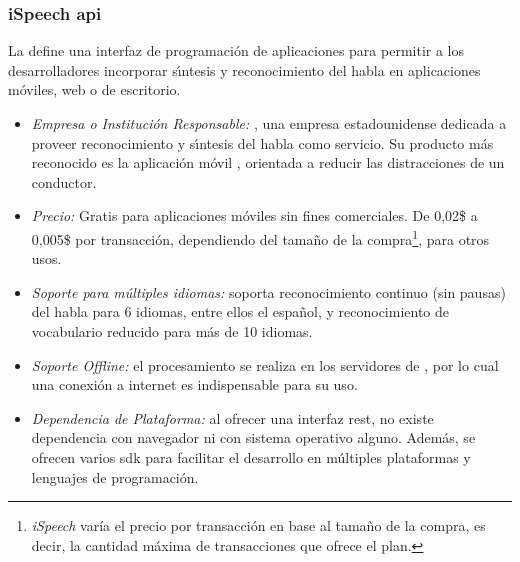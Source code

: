 \subsubsection{iSpeech \gls{api}}
\label{sec:ispeech}

La  \cite{iSpeech} define una interfaz de programaci\'on de aplicaciones para 
permitir a los desarrolladores incorporar s{\'\i}ntesis y reconocimiento del habla en aplicaciones 
m\'oviles, web o de escritorio.

\begin{itemize}
	\item \emph{Empresa o Instituci\'on Responsable:} , una empresa estadounidense dedicada a
	proveer reconocimiento y s{\'\i}ntesis del habla como servicio. Su producto m\'as reconocido es la aplicaci\'on m\'ovil
	, orientada a reducir las distracciones de un conductor.
	\item \emph{Precio:} Gratis para aplicaciones m\'oviles sin fines comerciales. De 0,02\$ a 0,005\$ por
        transacci\'on, dependiendo del tama\~no de la compra\footnote{\emph{iSpeech} var\'ia el precio por transacci\'on
    en base al tama\~no de la compra, es decir, la cantidad m\'axima de transacciones que ofrece el plan.}, para otros usos.
	\item \emph{Soporte para m\'ultiples idiomas:} soporta reconocimiento continuo (sin pausas) del habla para 6 idiomas,
	entre ellos el espa\~nol, y reconocimiento de vocabulario reducido para m\'as de 10 idiomas.
	\item \emph{Soporte Offline:} el procesamiento se realiza en los servidores de , por lo cual
	una conexi\'on a internet es indispensable para su uso.
	\item \emph{Dependencia de Plataforma:} al ofrecer una interfaz \gls{rest}, no existe dependencia con navegador
	ni con sistema operativo alguno. Adem\'as, se ofrecen varios \gls{sdk} para facilitar
	el desarrollo en m\'ultiples plataformas y lenguajes de programaci\'on.
\end{itemize}